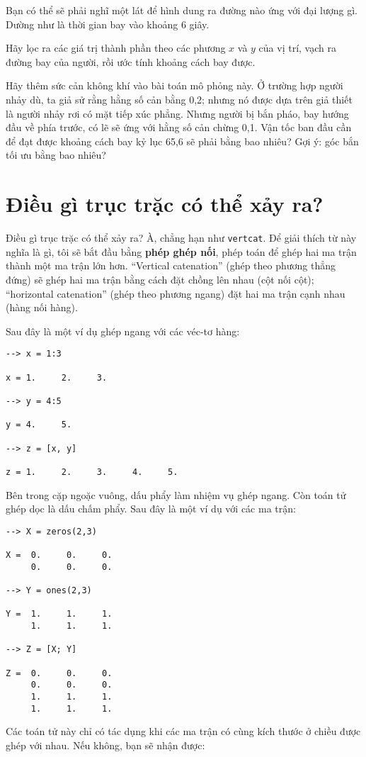 \documentclass[12pt]{book}
\begin{document}
Bạn có thể sẽ phải nghĩ một lát để hình dung ra đường nào
ứng với đại lượng gì. Dường như là thời gian bay vào khoảng
6 giây.

\begin{ex}
Hãy lọc ra các giá trị thành phần theo các phương $x$ và $y$ 
của vị trí, vạch ra đường bay của người, rồi ước tính khoảng
cách bay được.
\end{ex}

\begin{ex}
Hãy thêm sức cản không khí vào bài toán mô phỏng này. Ở
trường hợp người nhảy dù, ta giả sử rằng hằng số cản bằng
0,2; nhưng nó được dựa trên giả thiết là người nhảy rơi
có mặt tiếp xúc phẳng. Nhưng người bị bắn pháo, bay 
hướng đầu về phía trước, có lẽ sẽ ứng với hằng số cản
chừng 0,1. Vận tốc ban đầu cần để đạt được khoảng cách
bay kỷ lục 65,6 sẽ phải bằng bao nhiêu? Gợi ý: góc bắn
tối ưu bằng bao nhiêu?
\end{ex}


\section{Điều gì trục trặc có thể xảy ra?}

Điều gì trục trặc có thể xảy ra?  À, chẳng hạn như {\tt vertcat}.
Để giải thích từ này nghĩa là gì, tôi sẽ bắt đầu bằng 
{\bf phép ghép nối}, phép toán để ghép hai ma trận thành
một ma trận lớn hơn. ``Vertical catenation'' (ghép theo
phương thẳng đứng) sẽ ghép hai ma trận bằng cách đặt
chồng lên nhau (cột nối cột); ``horizontal catenation'' 
(ghép theo phương ngang) đặt hai ma trận cạnh nhau
(hàng nối hàng).

Sau đây là một ví dụ ghép ngang với các véc-tơ hàng:

\begin{verbatim}
--> x = 1:3

x = 1.     2.     3.

--> y = 4:5

y = 4.     5.

--> z = [x, y]

z = 1.     2.     3.     4.     5.
\end{verbatim}
%
Bên trong cặp ngoặc vuông, dấu phẩy làm nhiệm vụ ghép ngang.
Còn toán tử ghép dọc là dấu chấm phẩy. Sau đây là một ví dụ với
các ma trận:

\begin{verbatim}
--> X = zeros(2,3)

X =  0.     0.     0.
     0.     0.     0.

--> Y = ones(2,3)

Y =  1.     1.     1.
     1.     1.     1.

--> Z = [X; Y]

Z =  0.     0.     0.
     0.     0.     0.
     1.     1.     1.
     1.     1.     1.
\end{verbatim}
%
Các toán tử này chỉ có tác dụng khi các ma trận có cùng kích thước
ở chiều được ghép với nhau. Nếu không, bạn sẽ nhận được:
\end{document}
